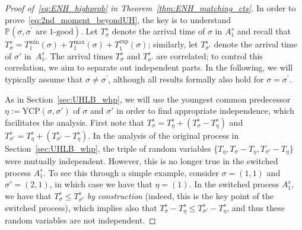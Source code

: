 \documentclass[11pt]{article}
\numberwithin{equation}{section}
\newcommand{\ycp}{\mathrm{YCP}} %
\theoremstyle{definition}
\begin{document}
\begin{proof}[Proof of~\eqref{eq:ENH_highprob} in Theorem~\ref{thm:ENH_matching_cts}]
In order to prove~\eqref{eq:2nd_moment_beyondUH}, the key is to understand 
$\mathbb{P} \left( \sigma, \sigma^\prime \text{ are 1-good}  \right)$. 
Let $T_{\sigma}^{s}$ denote the arrival time of $\sigma$ in $A_{1}^{s}$ 
and recall that $T_{\sigma}^{s} = T_{1}^{\min}(\sigma) + T_{1}^{\max}(\sigma) + T_{1}^{\exp}(\sigma)$; 
similarly, let 
$T_{\sigma'}^{s}$ denote the arrival time of $\sigma'$ in~$A_{1}^{s}$. 
The arrival times $T_{\sigma}^{s}$ and $T_{\sigma'}^{s}$ are correlated; 
to control this correlation, we aim to separate out independent parts. In the following, we will typically assume that $\sigma \neq \sigma^\prime$, although all results formally also hold for $\sigma = \sigma^\prime$.

As in Section~\ref{sec:UHLB_whp}, we will use the youngest common predecessor 
$\eta := \ycp(\sigma, \sigma')$ 
of $\sigma$ and $\sigma'$ 
in order to find appropriate independence, 
which facilitates the analysis. 
First note that 
$T_{\sigma}^{s} = T_{\eta}^{s} + (T_{\sigma}^{s} - T_{\eta}^{s})$ 
and 
$T_{\sigma'}^{s} = T_{\eta}^{s} + (T_{\sigma'}^{s} - T_{\eta}^{s})$. 
In the analysis of the original process in Section~\ref{sec:UHLB_whp}, 
the triple of random variables 
$\{ T_{\eta}, T_{\sigma} - T_{\eta}, T_{\sigma'} - T_{\eta} \}$
were mutually independent. 
However, this is no longer true in the switched process $A_{1}^{s}$. 
To see this through a simple example, consider $\sigma = (1,1)$ and $\sigma' = (2,1)$, in which case we have that $\eta = (1)$. In the switched process $A_{1}^{s}$, we have that 
$T_{\sigma}^{s} \leq T_{\sigma'}^{s}$ 
\emph{by construction} 
(indeed, this is the key point of the switched process), 
which implies also that 
$T_{\sigma}^{s} - T_{\eta}^{s} \leq T_{\sigma'}^{s} - T_{\eta}^{s}$, 
and thus these random variables are not independent. 



\end{proof}
\end{document}
